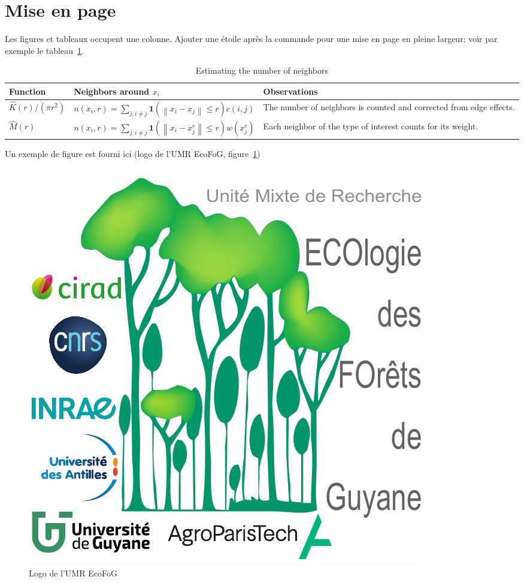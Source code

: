\documentclass[fleqn,10pt]{ArtEcoFoG} %
\begin{document}
\section{Mise en page}\label{sec:misenpage}

Les figures et tableaux occupent une colonne.
Ajouter une étoile après la commande pour une mise en page en pleine largeur; voir par exemple le tableau~\ref{table:step1}.

\begin{table}
  \caption{Estimating the number of neighbors}
  \centering
  \begin{tabularx}{\textwidth}{p{3cm} p{7cm} X}
    \toprule
    Function & Neighbors around $x_i$ & Observations \\
    \midrule
    
    $\widehat{K} \left( r \right) / \left( \pi r^2 \right)$ 
    & $\displaystyle n\left(x_i,r\right) = \sum_{j, i \ne j} \mathbf{1} \left(\left\|x_i - x_j \right\| \le r \right) c\left( i,j \right)$
    & The number of neighbors is counted and corrected from edge effects. \\ 
    
    $\widehat{M} \left( r \right) $ 
    & $\displaystyle n \left( x_i, r \right) = \sum_{j, i \ne j}{\mathbf{1} \left( \left\| x_i - x^c_j \right\| \le r \right) w \left( x^c_j \right)}$ 
    & Each neighbor of the type of interest counts for its weight. \\
    
    \bottomrule
  \end{tabularx}
  \label{table:step1}
\end{table}
 
Un exemple de figure est fourni ici (logo de l'UMR EcoFoG, figure~\ref{fig:ecofog2021})

\begin{figure}
  \centering
  \includegraphics[width=0.8\linewidth]{EcoFoG2021}
  \caption{Logo de l'UMR EcoFoG}
  \label{fig:ecofog2021}
\end{figure}
\end{document}
